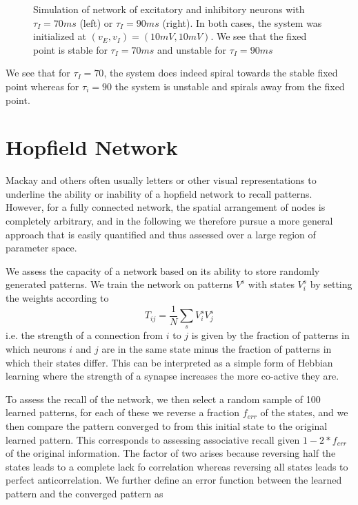 \documentclass{article}
\begin{document}
\begin{figure}[h]
\begin{subfigure}[t]{0.45\linewidth}
		\label{fig:div}	
	\end{subfigure}%
\label{fig:sims}
\caption{Simulation of network of excitatory and inhibitory neurons with $\tau_I = 70 ms$ (left) or $\tau_I = 90 ms$ (right). In both cases, the system was initialized at $(v_E, v_I) = (10 mV, 10 mV)$. We see that the fixed point is stable for $\tau_I = 70 ms$ and unstable for $\tau_I = 90 ms$ }
\end{figure}

We see that for $\tau_I = 70$, the system does indeed spiral towards the stable fixed point whereas for $\tau_i = 90$ the system is unstable and spirals away from the fixed point.

\section{Hopfield Network}

Mackay and others often usually letters or other visual representations to underline the ability or inability of a hopfield network to recall patterns. However, for a fully connected network, the spatial arrangement of nodes is completely arbitrary, and in the following we therefore pursue a more general approach that is easily quantified and thus assessed over a large region of parameter space.

We assess the capacity of a network based on its ability to store randomly generated patterns. We train the network on patterns  $V^s$ with states $V^s_i$ by setting the weights according to
\begin{equation}
T_{ij} = \dfrac{1}{N} \sum_s{V_i^s V_j^s}
\end{equation}
i.e. the strength of a connection from $i$ to $j$ is given by the fraction of patterns in which neurons $i$ and $j$ are in the same state minus the fraction of patterns in which their states differ. This can be interpreted as a simple form of Hebbian learning where the strength of a synapse increases the more co-active they are.

To assess the recall of the network, we then select a random sample of 100 learned patterns, for each of these we reverse a fraction $f_{err}$ of the states, and we then compare the pattern converged to from this initial state to the original learned pattern. This corresponds to assessing associative recall given $1-2*f_{err}$ of the original information. The factor of two arises because reversing half the states leads to a complete lack fo correlation whereas reversing all states leads to perfect anticorrelation. We further define an error function between the learned pattern and the converged pattern as 
\end{document}
